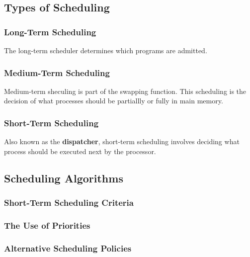 \documentclass[11pt]{article}
\begin{document}
\subsection{Types of Scheduling}
\label{sec-3-1}

\subsubsection{Long-Term Scheduling}
\label{sec-3-1-1}

The long-term scheduler determines which programs are
admitted.

\subsubsection{Medium-Term Scheduling}
\label{sec-3-1-2}

Medium-term sheculing is part of the swapping function. This scheduling
is the decision of what processes should be partiallly or fully in main
memory.

\subsubsection{Short-Term Scheduling}
\label{sec-3-1-3}

Also known as the \textbf{dispatcher}, short-term scheduling involves deciding
what process should be executed next by the processor.

\subsection{Scheduling Algorithms}
\label{sec-3-2}

\subsubsection{Short-Term Scheduling Criteria}
\label{sec-3-2-1}



\subsubsection{The Use of Priorities}
\label{sec-3-2-2}



\subsubsection{Alternative Scheduling Policies}
\label{sec-3-2-3}
\end{document}
